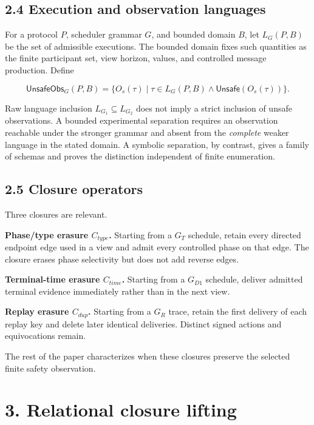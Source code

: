 \documentclass[10pt,a4paper]{article}
\begin{document}
\subsection{2.4 Execution and observation
languages}\label{execution-and-observation-languages}

For a protocol \(P\), scheduler grammar \(G\), and bounded domain \(B\),
let \(L_G(P,B)\) be the set of admissible executions. The bounded domain
fixes such quantities as the finite participant set, view horizon,
values, and controlled message production. Define

\[
\mathsf{UnsafeObs}_G(P,B)=
\{O_s(\tau)\mid \tau\in L_G(P,B)\land \mathsf{Unsafe}(O_s(\tau))\}.
\]

Raw language inclusion \(L_{G_1}\subseteq L_{G_2}\) does not imply a
strict inclusion of unsafe observations. A bounded experimental
separation requires an observation reachable under the stronger grammar
and absent from the \emph{complete} weaker language in the stated
domain. A symbolic separation, by contrast, gives a family of schemas
and proves the distinction independent of finite enumeration.

\subsection{2.5 Closure operators}\label{closure-operators}

Three closures are relevant.

\textbf{Phase/type erasure \(C_{type}\).} Starting from a \(G_T\)
schedule, retain every directed endpoint edge used in a view and admit
every controlled phase on that edge. The closure erases phase
selectivity but does not add reverse edges.

\textbf{Terminal-time erasure \(C_{time}\).} Starting from a \(G_{D1}\)
schedule, deliver admitted terminal evidence immediately rather than in
the next view.

\textbf{Replay erasure \(C_{dup}\).} Starting from a \(G_R\) trace,
retain the first delivery of each replay key and delete later identical
deliveries. Distinct signed actions and equivocations remain.

The rest of the paper characterizes when these closures preserve the
selected finite safety observation.

\section{3. Relational closure
lifting}\label{relational-closure-lifting}
\end{document}

